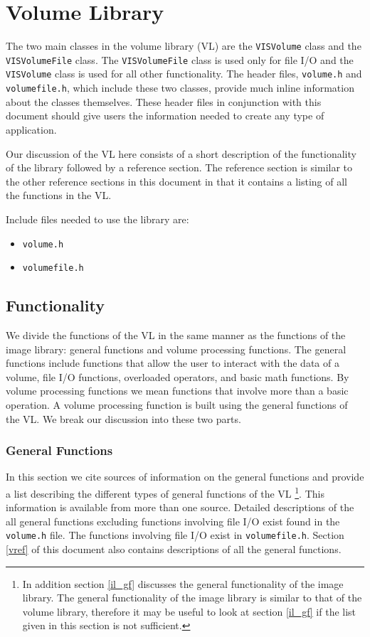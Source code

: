 \section{Volume Library}
\label{sect:vol}
The two main classes in the volume library (VL) are the {\tt VISVolume}
class and the {\tt VISVolumeFile} class.
The {\tt VISVolumeFile} class is used only for file I/O and 
the {\tt VISVolume} class is used for all other functionality.
The header files, {\tt volume.h} and {\tt volumefile.h},
which include these two classes, provide much inline information
about the classes themselves.
These header files in conjunction with this document should give
users the information needed to create any type of application.

Our discussion of the VL here consists of a short description
of the functionality of the library followed by a reference
section.  The reference section is similar to the other
reference sections in this document in that it contains
a listing of all the functions in the VL.

Include files needed to use the library are:
\begin{itemize}
\item {\tt volume.h}
\item {\tt volumefile.h}
\end{itemize}

\subsection{Functionality}
We divide the functions of the VL in the same manner as
the functions of the image library:  general functions
and volume processing functions.
The general functions include functions that allow the user
to interact with the data of a volume, file I/O functions, overloaded
operators, and basic math functions.
By volume processing functions we mean functions that 
involve more than a basic operation.  A volume processing function
is built using the general functions of the VL.
We break our discussion into these two parts.

\subsubsection{General Functions}
In this section we cite sources of information on the general functions
and provide a list describing the different types of general functions
of the VL \footnote{In addition section \ref{il_gf} discusses the general
functionality of the image library.  The general functionality of the
image library is similar to that of the volume library, therefore
it may be useful to look at section \ref{il_gf} if the list given
in this section is not sufficient.}.
This information is available from more than one source.
Detailed descriptions of the all general functions excluding functions
involving file I/O exist found in the {\tt volume.h} file.
The functions involving file I/O exist in {\tt volumefile.h}.
Section \ref{vref} of this document also contains descriptions of
all the general functions.

